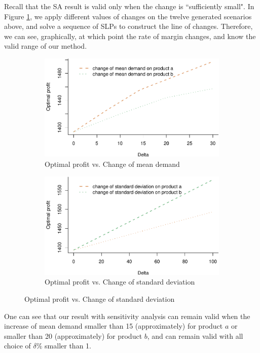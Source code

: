 \documentclass[a4paper,11pt]{article}
\begin{document}
Recall that the SA result is valid only when the change is ``sufficiently small". In Figure \ref{fig:slp}, we
apply different values of changes on the twelve  generated scenarios above, and solve a sequence of SLPs to construct the line of changes. Therefore, we can see, graphically, at which point the rate of margin changes, and know
the valid range of our method. 
\begin{figure}[htb]
\caption{Line of change constructed by solving SLP}
\begin{subfigure}{\textwidth}
\centering
\includegraphics{Example-figure_files/figure-latex/mean-1.pdf}
\caption{Optimal profit vs. Change of mean demand}
\end{subfigure}
\bigskip
\begin{subfigure}{\textwidth}
\centering
\includegraphics{Example-figure_files/figure-latex/var-1.pdf}
\caption{Optimal profit vs. Change of standard deviation}
\end{subfigure}
\label{fig:slp}
\end{figure}

One can see that our result with sensitivity analysis can remain valid when the increase of mean demand smaller than 15 (approximately) for product $a$ or smaller than 20 (approximately) for product $b$, and can remain valid with all choice of $\delta \%$ smaller than 1. 
\end{document}
